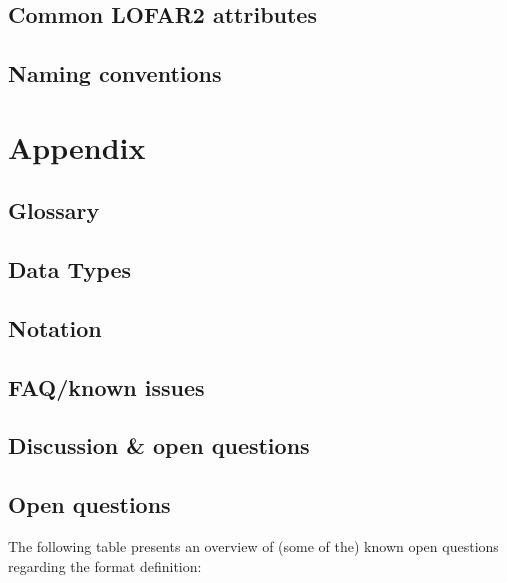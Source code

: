 \documentclass[a4paper,10pt,bibtotoc]{scrartcl}
\begin{document}
\subsection{Common LOFAR2 attributes}

\subsection{Naming conventions}






\clearpage

\appendix
\section{Appendix}

\subsection{Glossary}
\label{sec:glossary}




\subsection{Data Types}

\subsection{Notation}

\subsection{FAQ/known issues}


\subsection{Discussion \& open questions}

\subsection{Open questions}

The following table presents an overview of (some of the) known open
questions regarding the format definition:
\end{document}
